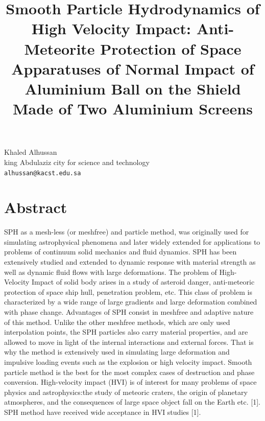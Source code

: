 \documentclass[article, A4, 11pt]{llncs}%
\begin{document}
\title{Smooth Particle Hydrodynamics of High Velocity Impact: Anti-Meteorite Protection of Space Apparatuses of Normal Impact of Aluminium Ball on the Shield Made of Two Aluminium Screens}
 \author{} \institute{}
\maketitle
\begin{center}
{\large Khaled Alhussan}\\
king Abdulaziz city for science and technology\\
{\tt alhussan@kacst.edu.sa}
\end{center}

\section*{Abstract}
SPH as a mesh-less (or meshfree) and particle method, was originally used for simulating astrophysical phenomena and later widely extended for applications to problems of continuum solid mechanics and fluid dynamics. SPH has been extensively studied and extended to dynamic response with material strength as well as dynamic fluid flows with large deformations. The problem of High-Velocity Impact of solid body arises in a study of asteroid danger, anti-meteoric protection of space ship hull, penetration problem, etc. This class of problem is characterized by a wide range of large gradients and large deformation combined with phase change.  Advantages of SPH consist in meshfree and adaptive nature of this method. Unlike the other meshfree methods, which are only used interpolation points, the SPH particles also carry material properties, and are allowed to move in light of the internal interactions and external forces. That is why the method is extensively used in simulating large deformation and impulsive loading events such as the explosion or high velocity impact. Smooth particle method is the best for the most complex cases of destruction and phase conversion.
High-velocity impact (HVI) is of interest for many problems of space physics and astrophysics:the study of meteoric craters, the origin of planetary atmospheres, and the consequences of large space object fall on the Earth etc. [1]. SPH method have received wide acceptance in HVI studies [1]. 
\end{document}

